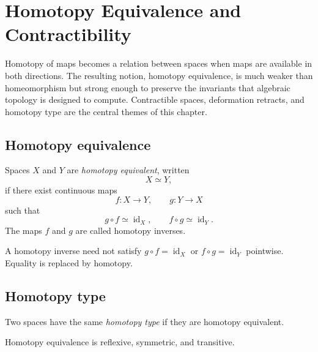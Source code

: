 ﻿\chapter{Homotopy Equivalence and Contractibility}
\label{ch:viii02-homotopy-equivalence}

Homotopy of maps becomes a relation between spaces when maps are available in
both directions.  The resulting notion, homotopy equivalence, is much weaker
than homeomorphism but strong enough to preserve the invariants that algebraic
topology is designed to compute.  Contractible spaces, deformation retracts,
and homotopy type are the central themes of this chapter.

\section{Homotopy equivalence}

\begin{definition}
\label{def:viii02-equivalence}
Spaces \(X\) and \(Y\) are \emph{homotopy equivalent}, written
\[
X\simeq Y,
\]
if there exist continuous maps
\[
f:X\to Y,
\qquad
g:Y\to X
\]
such that
\[
g\circ f\simeq \operatorname{id}_X,
\qquad
f\circ g\simeq \operatorname{id}_Y.
\]
The maps \(f\) and \(g\) are called homotopy inverses.
\end{definition}

\begin{warning}
\label{warn:viii02-not-inverse}
A homotopy inverse need not satisfy \(g\circ f=\operatorname{id}_X\) or
\(f\circ g=\operatorname{id}_Y\) pointwise.  Equality is replaced by homotopy.
\end{warning}

\section{Homotopy type}

\begin{definition}
\label{def:viii02-type}
Two spaces have the same \emph{homotopy type} if they are homotopy equivalent.
\end{definition}

\begin{proposition}
\label{prop:viii02-equivalence-relation}
Homotopy equivalence is reflexive, symmetric, and transitive.
\end{proposition}

